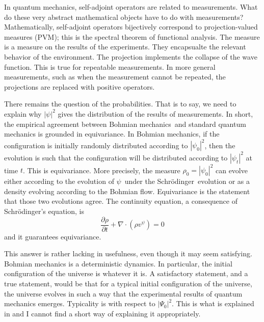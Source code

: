 \documentclass[11pt]{article}
\theoremstyle{remark}
\begin{document}
In quantum mechanics, self-adjoint operators are related to
measurements. What do these very abstract mathematical objects have to
do with measurements? Mathematically, self-adjoint operators
bijectively correspond to projection-valued measures (PVM); this is
the spectral theorem of functional analysis. The measure is a measure
on the results of the experiments. They encapsualte the relevant
behavior of the environment. The projection implements the collapse of
the wave function. This is true for repeatable measurements. In more general
measurements, such as when the measurement cannot be repeated, 
the projections are replaced
with positive operators.   

There remains the question of the probabilities. That is to
say, we need to explain why $\ensuremath{\lvert {\ensuremath{\psi}} \rvert}^2$ gives the distribution of
the results of measurements. 
In short, 
the empirical agreement between Bohmian mechanics\ and standard quantum mechanics is
grounded in equivariance. 
  In Bohmian mechanics,  if the 
configuration is initially randomly distributed according to $|\ensuremath{\psi}_0|^2$,
then the evolution is such that the configuration will 
be distributed according to $|\ensuremath{\psi}_t|^2$ at time $t$. 
This is
equivariance. More precisely, the measure $\ensuremath{\rho}_0 = 
|\ensuremath{\psi}_0|^2$ can evolve either according to the evolution of \ensuremath{\psi}\ under
the Schr\"odinger\ evolution or as a density evolving according to the Bohmian
flow. Equivariance is the statement that those two evolutions agree.  
The continuity equation, a consequence of Schr\"odinger's equation, is 
\begin{equation}
\ensuremath{\frac{\partial {\ensuremath{\rho}}}{\partial {t}}} + \nabla \cdot (\ensuremath{\rho} v^{\ensuremath{\psi}}) = 0 
\end{equation}
and it guarantees equivariance.  

This answer 
is rather lacking in usefulness, even though it may seem satisfying. 
 Bohmian mechanics is a deterministic
dynamics. In particular, the initial
configuration of the universe is whatever it is. A satisfactory
statement, and a true statement,
 would be that for a typical initial configuration of the
universe, the universe evolves in such a way that the experimental
results of quantum mechanics emerges. Typicality is with respect to
$\ensuremath{\lvert {\Psi_0} \rvert}^2$. This is what is explained in \cite{DGZ92} and I
cannot find a short way of explaining it appropriately. 
\end{document}
